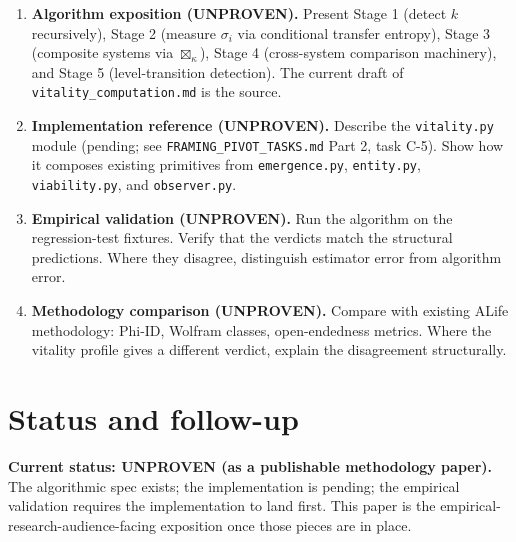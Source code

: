 \documentclass[11pt]{article}
\theoremstyle{plain}
\theoremstyle{definition}
\begin{document}
\begin{enumerate}[leftmargin=2em,itemsep=4pt]
  \item \textbf{Algorithm exposition (UNPROVEN).} Present Stage 1
    (detect $k$ recursively), Stage 2 (measure $\sigma_i$ via
    conditional transfer entropy), Stage 3 (composite systems via
    $\boxtimes_\kappa$), Stage 4 (cross-system comparison machinery),
    and Stage 5 (level-transition detection). The current draft of
    \texttt{vitality\_computation.md} is the source.
  \item \textbf{Implementation reference (UNPROVEN).} Describe the
    \texttt{vitality.py} module (pending; see
    \texttt{FRAMING\_PIVOT\_TASKS.md} Part 2, task C-5). Show how
    it composes existing primitives from \texttt{emergence.py},
    \texttt{entity.py}, \texttt{viability.py}, and
    \texttt{observer.py}.
  \item \textbf{Empirical validation (UNPROVEN).} Run the algorithm
    on the regression-test fixtures. Verify that the verdicts match
    the structural predictions. Where they disagree, distinguish
    estimator error from algorithm error.
  \item \textbf{Methodology comparison (UNPROVEN).} Compare with
    existing ALife methodology: Phi-ID, Wolfram classes,
    open-endedness metrics. Where the vitality profile gives a
    different verdict, explain the disagreement structurally.
\end{enumerate}

\section{Status and follow-up}

\textbf{Current status: UNPROVEN (as a publishable methodology paper).}
The algorithmic spec exists; the implementation is pending; the
empirical validation requires the implementation to land first. This
paper is the empirical-research-audience-facing exposition once
those pieces are in place.



\end{document}
